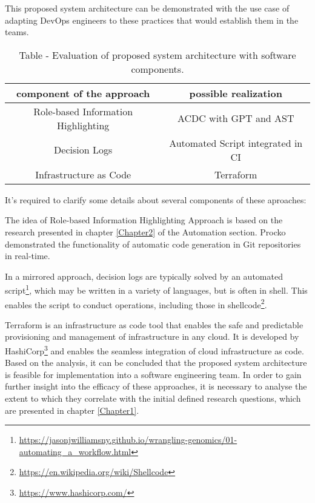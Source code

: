 This proposed system architecture can be demonstrated with the use case of adapting \ac{DevOps} engineers to these practices that would establish them in the teams. 

\begin{table}[h!]
\begin{tabular}{|c|c|}
\hline
\textbf{component of the approach}  & \textbf{possible realization}   \\[1ex]
\hline
Role-based Information Highlighting & \ac{ACDC} with \ac{GPT} and \ac{AST}    \\[1ex]
\hline
Decision Logs  &  Automated Script integrated in \ac{CI}  \\[1ex]
\hline
Infrastructure as Code &   Terraform \\[1ex]
\hline
\end{tabular}
\caption{Table - Evaluation of proposed system architecture with software components.}
\label{table:1}
\end{table}

It's required to clarify some details about several components of these aproaches:

The idea of Role-based Information Highlighting Approach is based on the research presented in chapter \ref{Chapter2} of the Automation section. Procko \cite{Procko2024CodeDocumentation} demonstrated the functionality of automatic code generation in Git repositories in real-time.

In a mirrored approach, decision logs are typically solved by an automated script\footnote{\url{https://jasonjwilliamsny.github.io/wrangling-genomics/01-automating_a_workflow.html}}, which may be written in a variety of languages, but is often in shell. This enables the script to conduct operations, including those in shellcode\footnote{\url{https://en.wikipedia.org/wiki/Shellcode}}.

Terraform is an infrastructure as code tool that enables the safe and predictable provisioning and management of infrastructure in any cloud. It is developed by HashiCorp\footnote{\url{https://www.hashicorp.com/}} and enables the seamless integration of cloud infrastructure as code.
Based on the analysis, it can be concluded that the proposed system architecture is feasible for implementation into a software engineering team. In order to gain further insight into the efficacy of these approaches, it is necessary to analyse the extent to which they correlate with the initial defined research questions, which are presented in chapter \ref{Chapter1}.

